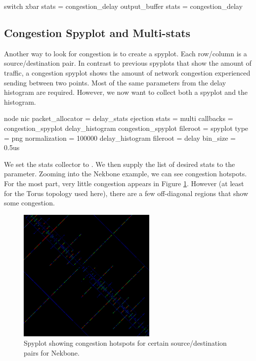 \begin{ViFile}
switch {
 xbar {
   stats = congestion_delay
 }
 output_buffer {
  stats = congestion_delay
 }
}
\end{ViFile}

\subsection{Congestion Spyplot and Multi-stats}
\label{subsec:congestionSpyplot}

Another way to look for congestion is to create a spyplot.
Each row/column is a source/destination pair.
In contrast to previous spyplots that show the amount of traffic,
a congestion spyplot shows the amount of network congestion experienced sending between two points.
Most of the same parameters from the delay histogram are required.
However, we now want to collect both a spyplot and the histogram.

\begin{ViFile}
node {
 nic {
  packet_allocator = delay_stats
  ejection {
   stats = multi
   callbacks = congestion_spyplot delay_histogram
   congestion_spyplot {
    fileroot = spyplot
    type = png
    normalization = 100000
   }
   delay_histogram {
    fileroot = delay
    bin_size = 0.5us
   }
  }
 }
}
\end{ViFile}

We set the stats collector to .
We then supply the list of desired stats to the  parameter.
Zooming into the Nekbone example, we can see congestion hotspots.
For the most part, very little congestion appears in Figure \ref{fig:nekboneCongestionSpyplot}.
However (at least for the Torus topology used here),
there are a few off-diagonal regions that show some congestion.

\begin{figure}
\centering
\includegraphics[width=0.6\textwidth]{figures/congestionSpyplotNekbone}
\caption{Spyplot showing congestion hotspots for certain source/destination pairs for Nekbone.}
\label{fig:nekboneCongestionSpyplot}
\end{figure}




